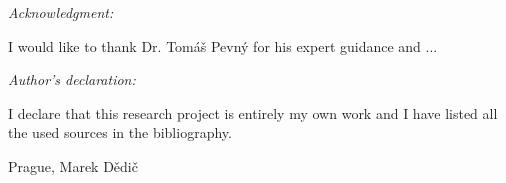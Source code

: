 \noindent \textit{\Large Acknowledgment:}

\noindent I would like to thank Dr. Tomáš Pevný for his expert guidance and ...

\vfill

\noindent \textit{\Large Author's declaration:}

\noindent I declare that this research project is entirely my own work and I have listed all the used sources in the bibliography.

\bigskip

\noindent Prague, \documentdate\hfill Marek Dědič

\vspace{2cm}
